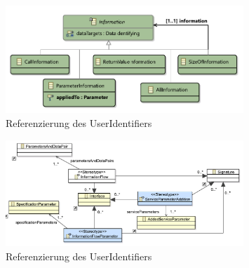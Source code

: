 \documentclass[twoside, ngerman]{sdqseminar}
\begin{document}
\begin{figure}[htbp]
	\label{informationPackage}
\centering
\includegraphics[width=0.8\textwidth]{images/new/information.pdf}
\caption{Referenzierung des UserIdentifiers}
\end{figure}
\begin{figure}[htbp]
	\label{repositoryProfil}
	\centering
	\includegraphics[width=0.8\textwidth]{images/old/repositoryProfile.pdf}
	\caption{Referenzierung des UserIdentifiers}
\end{figure}
\end{document}
